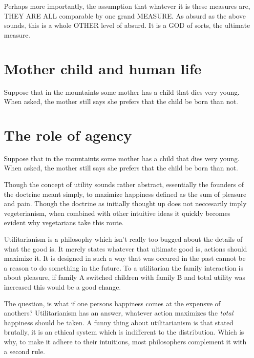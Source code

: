 Perhaps more importantly, the assumption that whatever it is these measures are, THEY ARE ALL comparable by one grand MEASURE. As absurd as the above sounds, this is a whole OTHER level of absurd. It is a GOD of sorts, the ultimate measure. 

\section{Mother child and human life}

Suppose that in the mountaints some mother has a child that dies very young. When asked, the mother still says she prefers that the child be born than not. 

\section{The role of agency}

Suppose that in the mountaints some mother has a child that dies very young. When asked, the mother still says she prefers that the child be born than not. 








Though the concept of utility sounds rather abstract, essentially the founders of the doctrine meant simply, to mazimize happiness defined as the sum of pleasure and pain. Though the doctrine as initially thought up does not neccesarily imply vegeterianism, when combined with other intuitive ideas it quickly becomes evident why vegetarians take this route. 

Utilitarianism is a philosophy which isn't really too bugged about the details of what the good is. It merely states whatever that ultimate good is, actions should maximize it. It is designed in such a way that was occured in the past cannot be a reason to do something in the future.  To a utilitarian the family interaction is about pleasure, if family A switched children with family B and total utility was increased this would be a good change. 

The question, is what if one persons happiness comes at the expensve of anothers? Utilitarianism has an answer, whatever action maximizes the \textit{total} happiness should be taken. A funny thing about utilitarianism is that stated brutally, it is an ethical system which is indifferent to the distribution. Which is why, to make it adhere to their intuitions, most philosophers complement it with a second rule. 

